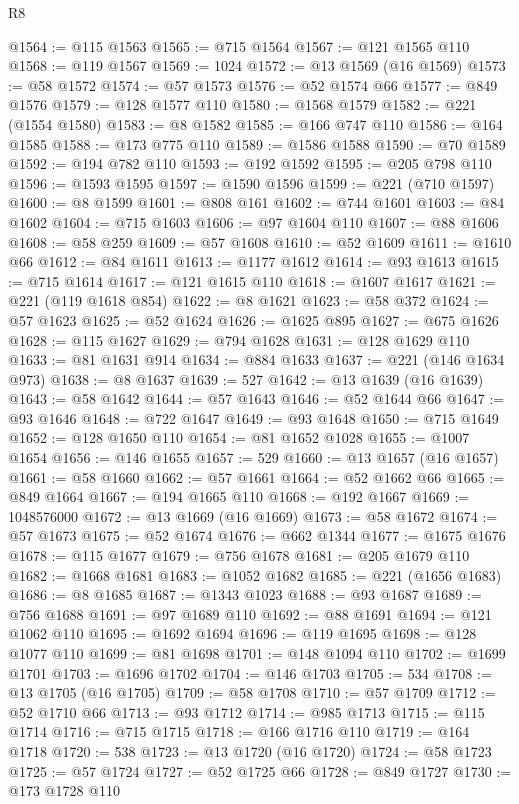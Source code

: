 \begin{lexlean}{R8}
\begin{coremodule}
@1564 := @115 @1563
@1565 := @715 @1564
@1567 := @121 @1565 @110
@1568 := @119 @1567
@1569 := 1024
@1572 := @13 @1569 (@16 @1569)
@1573 := @58 @1572
@1574 := @57 @1573
@1576 := @52 @1574 @66
@1577 := @849 @1576
@1579 := @128 @1577 @110
@1580 := @1568 @1579
@1582 := @221 (@1554 @1580)
@1583 := @8 @1582
@1585 := @166 @747 @110
@1586 := @164 @1585
@1588 := @173 @775 @110
@1589 := @1586 @1588
@1590 := @70 @1589
@1592 := @194 @782 @110
@1593 := @192 @1592
@1595 := @205 @798 @110
@1596 := @1593 @1595
@1597 := @1590 @1596
@1599 := @221 (@710 @1597)
@1600 := @8 @1599
@1601 := @808 @161
@1602 := @744 @1601
@1603 := @84 @1602
@1604 := @715 @1603
@1606 := @97 @1604 @110
@1607 := @88 @1606
@1608 := @58 @259
@1609 := @57 @1608
@1610 := @52 @1609
@1611 := @1610 @66
@1612 := @84 @1611
@1613 := @1177 @1612
@1614 := @93 @1613
@1615 := @715 @1614
@1617 := @121 @1615 @110
@1618 := @1607 @1617
@1621 := @221 (@119 @1618 @854)
@1622 := @8 @1621
@1623 := @58 @372
@1624 := @57 @1623
@1625 := @52 @1624
@1626 := @1625 @895
@1627 := @675 @1626
@1628 := @115 @1627
@1629 := @794 @1628
@1631 := @128 @1629 @110
@1633 := @81 @1631 @914
@1634 := @884 @1633
@1637 := @221 (@146 @1634 @973)
@1638 := @8 @1637
@1639 := 527
@1642 := @13 @1639 (@16 @1639)
@1643 := @58 @1642
@1644 := @57 @1643
@1646 := @52 @1644 @66
@1647 := @93 @1646
@1648 := @722 @1647
@1649 := @93 @1648
@1650 := @715 @1649
@1652 := @128 @1650 @110
@1654 := @81 @1652 @1028
@1655 := @1007 @1654
@1656 := @146 @1655
@1657 := 529
@1660 := @13 @1657 (@16 @1657)
@1661 := @58 @1660
@1662 := @57 @1661
@1664 := @52 @1662 @66
@1665 := @849 @1664
@1667 := @194 @1665 @110
@1668 := @192 @1667
@1669 := 1048576000
@1672 := @13 @1669 (@16 @1669)
@1673 := @58 @1672
@1674 := @57 @1673
@1675 := @52 @1674
@1676 := @662 @1344
@1677 := @1675 @1676
@1678 := @115 @1677
@1679 := @756 @1678
@1681 := @205 @1679 @110
@1682 := @1668 @1681
@1683 := @1052 @1682
@1685 := @221 (@1656 @1683)
@1686 := @8 @1685
@1687 := @1343 @1023
@1688 := @93 @1687
@1689 := @756 @1688
@1691 := @97 @1689 @110
@1692 := @88 @1691
@1694 := @121 @1062 @110
@1695 := @1692 @1694
@1696 := @119 @1695
@1698 := @128 @1077 @110
@1699 := @81 @1698
@1701 := @148 @1094 @110
@1702 := @1699 @1701
@1703 := @1696 @1702
@1704 := @146 @1703
@1705 := 534
@1708 := @13 @1705 (@16 @1705)
@1709 := @58 @1708
@1710 := @57 @1709
@1712 := @52 @1710 @66
@1713 := @93 @1712
@1714 := @985 @1713
@1715 := @115 @1714
@1716 := @715 @1715
@1718 := @166 @1716 @110
@1719 := @164 @1718
@1720 := 538
@1723 := @13 @1720 (@16 @1720)
@1724 := @58 @1723
@1725 := @57 @1724
@1727 := @52 @1725 @66
@1728 := @849 @1727
@1730 := @173 @1728 @110

\end{coremodule}
\end{lexlean}
